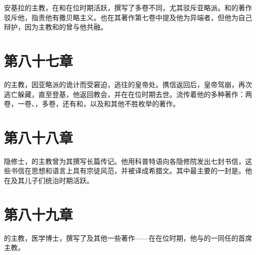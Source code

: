 安基拉的主教，在和在位时期活跃，撰写了多卷不同，尤其驳斥亚略派。和的著作驳斥他，指责他有撒贝略主义。也在其著作第七卷中提及他为异端者，但他为自己辩护，因为主教和的曾与他共融。\par


\section{第八十七章}

的主教，因亚略派的诡计而受窘迫，逃往的皇帝处。携信返回后，皇帝驾崩，再次逃亡躲藏，直至登基，他返回教会，并在在位时期去世。流传着他的多种著作：两卷，一卷、，多卷，还有和，以及和其他不胜枚举的著作。\par


\section{第八十八章}

隐修士，的主教曾为其撰写长篇传记。他用科普特语向各隐修院发出七封书信，这些书信在思想和语言上具有宗徒风范，并被译成希腊文。其中最主要的一封是。他在及其儿子们统治时期活跃。\par


\section{第八十九章}

的主教，医学博士，撰写了及其他一些著作——在在位时期，他与的一同任的首席主教。\par

